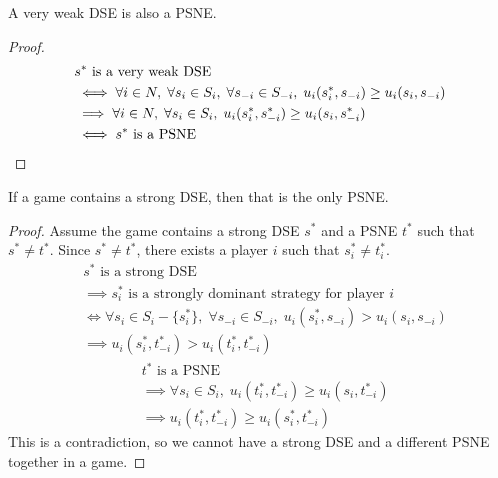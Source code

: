 \begin{theorem}
A very weak DSE is also a PSNE.
\end{theorem}
\begin{proof}
\begin{align*}
& s^* \textrm{ is a very weak DSE}
\\ &\iff \forall i \in N, \; \forall s_i \in S_i, \; \forall s_{-i} \in S_{-i},
    \; u_i(s^*_i, s_{-i}) \ge u_i(s_i, s_{-i})
\\ &\implies \forall i \in N, \; \forall s_i \in S_i,
    \; u_i(s^*_i, s^*_{-i}) \ge u_i(s_i, s^*_{-i})
\\ &\iff s^* \textrm{ is a PSNE}
\qedhere \end{align*}
\end{proof}

\begin{theorem}
If a game contains a strong DSE, then that is the only PSNE.
\end{theorem}
\begin{proof}
Assume the game contains a strong DSE $s^*$ and a PSNE $t^*$ such that $s^* \neq t^*$.
Since $s^* \neq t^*$, there exists a player $i$ such that $s^*_i \neq t^*_i$.
\begin{align*}
& s^* \textrm{ is a strong DSE}
\\ &\implies s^*_i \textrm{ is a strongly dominant strategy for player } i
\\ &\iff \forall s_i \in S_i - \{s_i^*\}, \; \forall s_{-i} \in S_{-i}, \;
    u_i(s_i^*, s_{-i}) > u_i(s_i, s_{-i})
\\ &\implies u_i(s_i^*, t_{-i}^*) > u_i(t_i^*, t_{-i}^*)
\end{align*}
\begin{align*}
& t^* \textrm{ is a PSNE}
\\ &\implies \forall s_i \in S_i, \;
    u_i(t_i^*, t_{-i}^*) \ge u_i(s_i, t_{-i}^*)
\\ &\implies u_i(t_i^*, t_{-i}^*) \ge u_i(s_i^*, t_{-i}^*)
\end{align*}
This is a contradiction, so we cannot have a strong DSE
and a different PSNE together in a game.
\end{proof}



